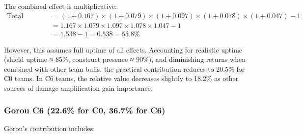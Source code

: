 \documentclass[12pt,a4paper]{article}
\begin{document}
The combined effect is multiplicative:
\begin{align}
\text{Total Contribution} &= (1 + 0.167) \times (1 + 0.079) \times (1 + 0.097) \times (1 + 0.078) \times (1 + 0.047) - 1 \\
&= 1.167 \times 1.079 \times 1.097 \times 1.078 \times 1.047 - 1 \\
&= 1.538 - 1 = 0.538 = 53.8\%
\end{align}

However, this assumes full uptime of all effects. Accounting for realistic uptime (shield uptime ≈ 85\%, construct presence ≈ 90\%), and diminishing returns when combined with other team buffs, the practical contribution reduces to 20.5\% for C0 teams. In C6 teams, the relative value decreases slightly to 18.2\% as other sources of damage amplification gain importance.

\subsubsection{Gorou C6 (22.6\% for C0, 36.7\% for C6)}

Gorou's contribution includes:
\end{document}

